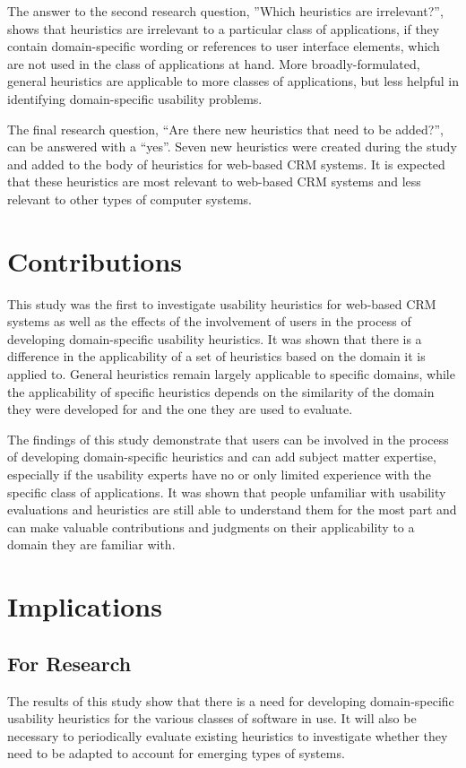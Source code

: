 The answer to the second research question, ''Which heuristics are irrelevant?'', shows that heuristics are irrelevant to a particular class of applications, if they contain domain-specific wording or references to user interface elements, which are not used in the class of applications at hand. More broadly-formulated, general heuristics are applicable to more classes of applications, but less helpful in identifying domain-specific usability problems.

The final research question, ``Are there new heuristics that need to be added?'', can be answered with a ``yes''. Seven new heuristics were created during the study and added to the body of heuristics for web-based CRM systems. It is expected that these heuristics are most relevant to web-based CRM systems and less relevant to other types of computer systems.

\section{Contributions}
This study was the first to investigate usability heuristics for web-based CRM systems as well as the effects of the involvement of users in the process of developing domain-specific usability heuristics. It was shown that there is a difference in the applicability of a set of heuristics based on the domain it is applied to. General heuristics remain largely applicable to specific domains, while the applicability of specific heuristics depends on the similarity of the domain they were developed for and the one they are used to evaluate.

The findings of this study demonstrate that users can be involved in the process of developing domain-specific heuristics and can add subject matter expertise, especially if the usability experts have no or only limited experience with the specific class of applications. It was shown that people unfamiliar with usability evaluations and heuristics are still able to understand them for the most part and can make valuable contributions and judgments on their applicability to a domain they are familiar with.

\section{Implications}
\subsection{For Research}
The results of this study show that there is a need for developing domain-specific usability heuristics for the various classes of software in use. It will also be necessary to periodically evaluate existing heuristics to investigate whether they need to be adapted to account for emerging types of systems.

